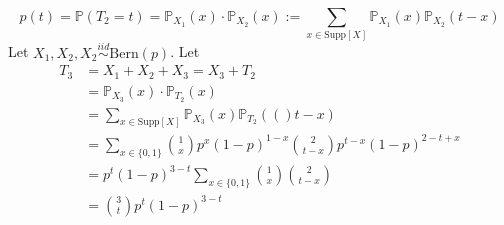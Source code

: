\documentclass[12pt]{article}
\newcommand{\prob}[1]{\mathbb{P}(#1)}
\newcommand{\probsub}[2]{\mathbb{P}_{#1}(#2)}
\begin{document}
$$p(t) = \prob{T_2 = t} = \probsub{X_1}{x}\cdot \probsub{X_2}{x} :=
\sum_{x \in \text{Supp}[X]} \probsub{X_1}{x}\probsub{X_2}{t - x} $$ 
Let $X_1, X_2, X_2 \stackrel{iid}{\sim} \text{Bern}(p)$. Let $$ \begin{aligned} T_3 &= X_1 + X_2 + X_3 = X_3 + T_2 \\ &= \probsub{X_3}{x} \cdot \probsub{T_2}{x} \\ &= \sum_{x \in \text{Supp}[X]} \probsub{X_3}{x}\probsub{T_2}(t - x) \\ &= \sum_{x \in \{0, 1\}} \binom{1}{x}p^x(1 - p)^{1 - x} \binom{2}{t - x}p^{t - x}(1 - p)^{2 - t + x} \\ &= p^t(1 - p)^{3 - t} \sum_{x \in \{0, 1\}} \binom{1}{x}\binom{2}{t - x} \\ &= \binom{3}{t}p^t(1- p)^{3 - t} \end{aligned} $$ 
\end{document}
